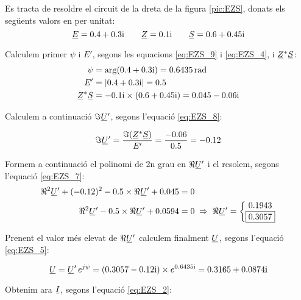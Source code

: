 \begin{exemple}\label{ex:ResCircPotAbs}
	\addcontentsxms{\ResCircPotAbs}
    Es tracta de resoldre el circuit de la dreta de la figura \vref{pic:EZS}, donats els següents valors en per unitat:\label{ex:res-circ-pot}
    \[
       \cmplx{E} = \complexnum{0,4 + j 0,3} \qquad \cmplx{Z} = \complexnum{j 0,1} \qquad
       \cmplx{S} = \complexnum{0,6 + j 0,45}
    \]

    Calculem primer $\psi$ i $E'$, segons les equacions \eqref{eq:EZS_9} i \eqref{eq:EZS_4},
    i $\cmplx{Z}^* \cmplx{S}$:
    \begin{align*}
       \psi &= \arg(\complexnum{0,4 + j 0,3}) = \qty{0,6435}{rad} \\
       E' &= |\complexnum{0,4 + j 0,3}| = \num {0,5} \\
       \cmplx{Z}^* \cmplx{S} &= \complexnum{- j 0,1} \times (\complexnum{0,6 + j 0,45}) = \complexnum{0,045 - j 0,06}
    \end{align*}

    Calculem a continuació $\Im\cmplx{U}'$, segons l'equació \eqref{eq:EZS_8}:

    \[
       \Im\cmplx{U}' = \frac{\Im(\cmplx{Z}^* \cmplx{S})}{E'} = \frac{\num{-0,06}}{\num{0,5}} = \num{-0,12}
    \]

    Formem a continuació el polinomi de 2n grau en $\Re\cmplx{U}'$ i el resolem, segons l'equació \eqref{eq:EZS_7}:
    \begin{align*}
       \Re^2\cmplx{U}' + (\num{-0,12})^2 - \num{0,5} \times \Re\cmplx{U}' + \num{0,045} &= 0 \\
       \Re^2\cmplx{U}' - \num{0,5} \times \Re\cmplx{U}' + \num{0,0594} &= 0  \;\Rightarrow\; \Re\cmplx{U}' =
       \left\{ \begin{matrix}
         \num{0,1943} \\
         \boxed{\num{0,3057}}
       \end{matrix}
       \right.
    \end{align*}

    Prenent el valor més elevat de $\Re\cmplx{U}'$ calculem finalment $\cmplx{U}$, segons l'equació \eqref{eq:EZS_5}:

    \[
       \cmplx{U} = \cmplx{U}' \, e^{j \psi} = (\complexnum{0,3057 - j 0,12}) \times e^{\complexnum{j 0,6435}} =
       \complexnum{0,3165 + j 0,0874}
    \]

    Obtenim ara $\cmplx{I}$, segons l'equació \eqref{eq:EZS_2}:


\end{exemple}
